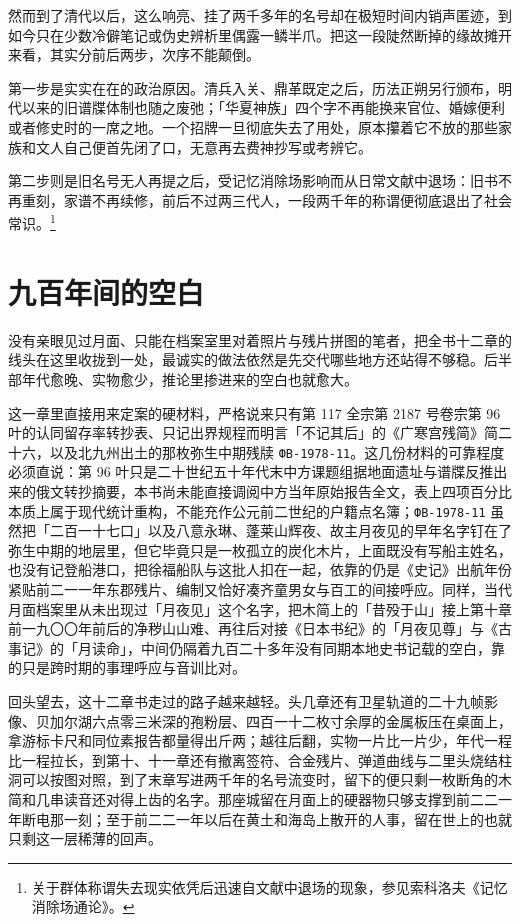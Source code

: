 然而到了清代以后，这么响亮、挂了两千多年的名号却在极短时间内销声匿迹，到如今只在少数冷僻笔记或伪史辨析里偶露一鳞半爪。把这一段陡然断掉的缘故摊开来看，其实分前后两步，次序不能颠倒。

第一步是实实在在的政治原因。清兵入关、鼎革既定之后，历法正朔另行颁布，明代以来的旧谱牒体制也随之废弛；「华夏神族」四个字不再能换来官位、婚嫁便利或者修史时的一席之地。一个招牌一旦彻底失去了用处，原本攥着它不放的那些家族和文人自己便首先闭了口，无意再去费神抄写或考辨它。

第二步则是旧名号无人再提之后，受记忆消除场影响而从日常文献中退场：旧书不再重刻，家谱不再续修，前后不过两三代人，一段两千年的称谓便彻底退出了社会常识。\footnote{关于群体称谓失去现实依凭后迅速自文献中退场的现象，参见索科洛夫《记忆消除场通论》。}

\section{九百年间的空白}

没有亲眼见过月面、只能在档案室里对着照片与残片拼图的笔者，把全书十二章的线头在这里收拢到一处，最诚实的做法依然是先交代哪些地方还站得不够稳。后半部年代愈晚、实物愈少，推论里掺进来的空白也就愈大。

这一章里直接用来定案的硬材料，严格说来只有第 117 全宗第 2187 号卷宗第 96 叶的认同留存率转抄表、只记出界规程而明言「不记其后」的《广寒宫残简》简二十六，以及北九州出土的那枚弥生中期残牍 \texttt{ФВ-1978-11}。这几份材料的可靠程度必须直说：第 96 叶只是二十世纪五十年代末中方课题组据地面遗址与谱牒反推出来的俄文转抄摘要，本书尚未能直接调阅中方当年原始报告全文，表上四项百分比本质上属于现代统计重构，不能充作公元前二世纪的户籍点名簿；\texttt{ФВ-1978-11} 虽然把「二百一十七口」以及八意永琳、蓬莱山辉夜、故主月夜见的早年名字钉在了弥生中期的地层里，但它毕竟只是一枚孤立的炭化木片，上面既没有写船主姓名，也没有记登船港口，把徐福船队与这批人扣在一起，依靠的仍是《史记》出航年份紧贴前二一一年东郡残片、编制又恰好凑齐童男女与百工的间接呼应。同样，当代月面档案里从未出现过「月夜见」这个名字，把木简上的「昔殁于山」接上第十章前一九〇〇年前后的净秽山山难、再往后对接《日本书纪》的「月夜见尊」与《古事记》的「月读命」，中间仍隔着九百二十多年没有同期本地史书记载的空白，靠的只是跨时期的事理呼应与音训比对。

回头望去，这十二章书走过的路子越来越轻。头几章还有卫星轨道的二十九帧影像、贝加尔湖六点零三米深的孢粉层、四百一十二枚寸余厚的金属板压在桌面上，拿游标卡尺和同位素报告都量得出斤两；越往后翻，实物一片比一片少，年代一程比一程拉长，到第十、十一章还有撤离签符、合金残片、弹道曲线与二里头烧结柱洞可以按图对照，到了末章写进两千年的名号流变时，留下的便只剩一枚断角的木简和几串读音还对得上齿的名字。那座城留在月面上的硬器物只够支撑到前二二一年断电那一刻；至于前二二一年以后在黄土和海岛上散开的人事，留在世上的也就只剩这一层稀薄的回声。
